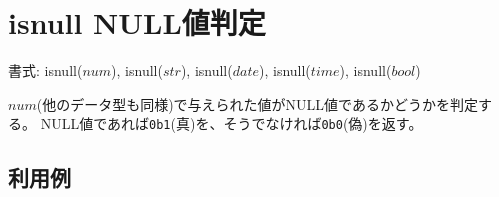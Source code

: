 
%

\section{isnull NULL値判定\label{sect:isnull}}

書式: isnull($num$), isnull($str$), isnull($date$), isnull($time$), isnull($bool$)

$num$(他のデータ型も同様)で与えられた値がNULL値であるかどうかを判定する。
NULL値であれば\verb|0b1|(真)を、そうでなければ\verb|0b0|(偽)を返す。

\subsection*{利用例}


%

